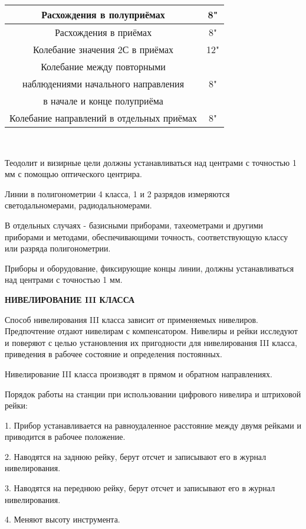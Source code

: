 \documentclass[a4paper]{article}
\begin{document}
{\begin{tabular}{|c|c|}
\hline
Расхождения в полуприёмах & 8" \\
\hline
Расхождения в приёмах & 8" \\
\hline
Колебание значения 2С в приёмах & 12" \\
\hline
Колебание между повторными &  \\
наблюдениями начального направления & 8" \\
в начале и конце полуприёма &  \\
\hline
Колебание направлений в отдельных приёмах & 8" \\
\hline
\end{tabular}
\\
\par Теодолит и визирные цели должны устанавливаться над центрами с точностью 1 мм с помощью оптического центрира.
\par Линии в полигонометрии 4 класса, 1 и 2 разрядов измеряются светодальномерами, радиодальномерами. 
\par В отдельных случаях - базисными приборами, тахеометрами и другими приборами и методами, обеспечивающими точность, соответствующую классу или разряда полигонометрии.
\par Приборы и оборудование, фиксирующие концы линии, должны устанавливаться над центрами с точностью 1 мм.
\begin{newpage}
\begin{center}
    \large{\textbf{НИВЕЛИРОВАНИЕ III КЛАССА}}
\end{center}
 \par Способ нивелирования III класса зависит от применяемых нивелиров. Предпочтение отдают нивелирам с компенсатором. Нивелиры и рейки исследуют и поверяют с целью установления их пригодности для нивелирования III класса, приведения в рабочее состояние и определения постоянных.
 \par Нивелирование III класса производят в прямом и обратном направлениях.
  \par Порядок работы на станции при использовании цифрового нивелира и штриховой рейки:
  \par 1. Прибор устанавливается на равноудаленное расстояние между двумя рейками и приводится в рабочее положение.
  \par 2. Наводятся на заднюю рейку, берут отсчет и записывают его в журнал нивелирования. \par 3. Наводятся на переднюю рейку, берут отсчет и записывают его в журнал нивелирования.
  \par 4. Меняют высоту инструмента.

\end{newpage}}
\end{document}
